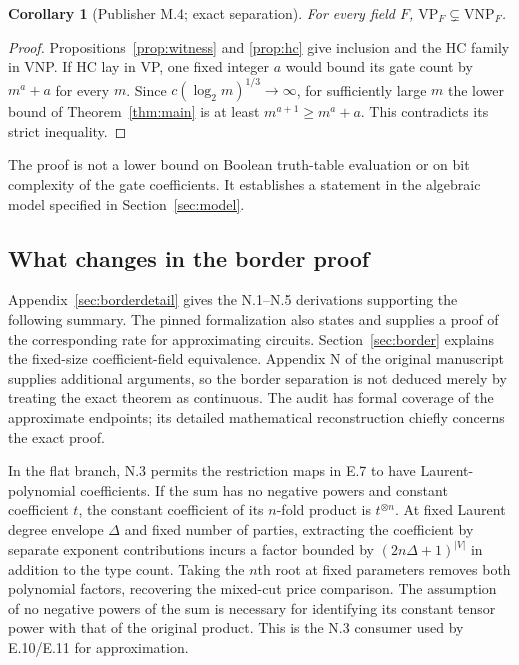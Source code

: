 \documentclass[11pt,letterpaper]{article}
\newtheorem{corollary}[theorem]{Corollary}
\theoremstyle{definition}\newtheorem{definition}[theorem]{Definition}\newtheorem{example}[theorem]{Example}
\theoremstyle{remark}\newtheorem{remark}[theorem]{Remark}
\newcommand{\VP}{\mathrm{VP}}
\newcommand{\VNP}{\mathrm{VNP}}
\begin{document}
\begin{corollary}[Publisher M.4; exact separation]
For every field $F$, $\VP_F\subsetneq\VNP_F$.
\end{corollary}
\begin{proof}
Propositions~\ref{prop:witness} and \ref{prop:hc} give inclusion and the HC family in VNP. If HC lay in VP, one fixed integer $a$ would bound its gate count by $m^a+a$ for every $m$. Since $c(\log_2m)^{1/3}\to\infty$, for sufficiently large $m$ the lower bound of Theorem~\ref{thm:main} is at least $m^{a+1}\ge m^a+a$. This contradicts its strict inequality.
\end{proof}
The proof is not a lower bound on Boolean truth-table evaluation or on bit complexity of the gate coefficients. It establishes a statement in the algebraic model specified in Section~\ref{sec:model}.

\subsection{What changes in the border proof}\label{sec:approx}
Appendix~\ref{sec:borderdetail} gives the N.1--N.5 derivations supporting the following summary.
The pinned formalization also states and supplies a proof of the corresponding rate for approximating circuits. Section~\ref{sec:border} explains the fixed-size coefficient-field equivalence. Appendix N of the original manuscript supplies additional arguments, so the border separation is not deduced merely by treating the exact theorem as continuous. The audit has formal coverage of the approximate endpoints; its detailed mathematical reconstruction chiefly concerns the exact proof.

In the flat branch, N.3 permits the restriction maps in E.7 to have Laurent-polynomial coefficients. If the sum has no negative powers and constant coefficient $t$, the constant coefficient of its $n$-fold product is $t^{\otimes n}$. At fixed Laurent degree envelope $\Delta$ and fixed number of parties, extracting the coefficient by separate exponent contributions incurs a factor bounded by $(2n\Delta+1)^{|V|}$ in addition to the type count. Taking the $n$th root at fixed parameters removes both polynomial factors, recovering the mixed-cut price comparison. The assumption of no negative powers of the sum is necessary for identifying its constant tensor power with that of the original product. This is the N.3 consumer used by E.10/E.11 for approximation.
\end{document}
